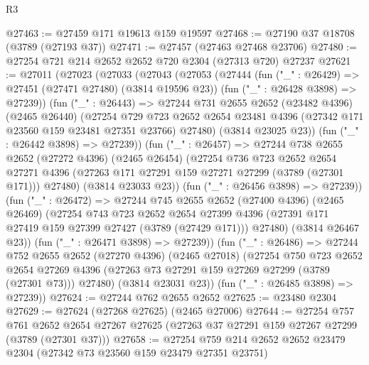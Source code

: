 \begin{lexlean}{R3}
\begin{coremodule}
@27463 := @27459 @171 @19613 @159 @19597
@27468 := @27190 @37 @18708 (@3789 (@27193 @37))
@27471 := @27457 (@27463 @27468 @23706)
@27480 := @27254 @721 @214 @2652 @2652 @720 @2304 (@27313 @720) @27237
@27621 := @27011
    (@27023
      (@27033
        (@27043
          (@27053
            (@27444
              (fun ("_" : @26429) => @27451 (@27471 @27480) (@3814 @19596 @23))
              (fun ("_" : @26428 @3898) => @27239))
            (fun ("_" : @26443) =>
            @27244
              @731
              @2655
              @2652
              (@23482 @4396)
              (@2465 @26440)
              (@27254
                @729
                @723
                @2652
                @2654
                @23481
                @4396
                (@27342 @171 @23560 @159 @23481 @27351 @23766)
                @27480)
              (@3814 @23025 @23))
            (fun ("_" : @26442 @3898) => @27239))
          (fun ("_" : @26457) =>
          @27244
            @738
            @2655
            @2652
            (@27272 @4396)
            (@2465 @26454)
            (@27254
              @736
              @723
              @2652
              @2654
              @27271
              @4396
              (@27263 @171 @27291 @159 @27271 @27299 (@3789 (@27301 @171)))
              @27480)
            (@3814 @23033 @23))
          (fun ("_" : @26456 @3898) => @27239))
        (fun ("_" : @26472) =>
        @27244
          @745
          @2655
          @2652
          (@27400 @4396)
          (@2465 @26469)
          (@27254
            @743
            @723
            @2652
            @2654
            @27399
            @4396
            (@27391 @171 @27419 @159 @27399 @27427 (@3789 (@27429 @171)))
            @27480)
          (@3814 @26467 @23))
        (fun ("_" : @26471 @3898) => @27239))
      (fun ("_" : @26486) =>
      @27244
        @752
        @2655
        @2652
        (@27270 @4396)
        (@2465 @27018)
        (@27254
          @750
          @723
          @2652
          @2654
          @27269
          @4396
          (@27263 @73 @27291 @159 @27269 @27299 (@3789 (@27301 @73)))
          @27480)
        (@3814 @23031 @23))
      (fun ("_" : @26485 @3898) => @27239))
@27624 := @27244 @762 @2655 @2652
@27625 := @23480 @2304
@27629 := @27624 (@27268 @27625) (@2465 @27006)
@27644 := @27254
    @757
    @761
    @2652
    @2654
    @27267
    @27625
    (@27263 @37 @27291 @159 @27267 @27299 (@3789 (@27301 @37)))
@27658 := @27254
    @759
    @214
    @2652
    @2652
    @23479
    @2304
    (@27342 @73 @23560 @159 @23479 @27351 @23751)

\end{coremodule}
\end{lexlean}
